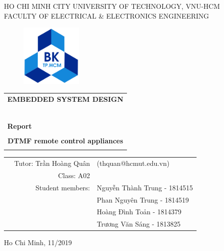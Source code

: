 \documentclass[a4paper]{article}
\begin{document}
\begin{titlepage}

\begin{center}
HO CHI MINH CITY UNIVERSITY OF TECHNOLOGY, VNU-HCM\\
FACULTY OF ELECTRICAL \& ELECTRONICS ENGINEERING
\end{center}

\vspace{1cm}

\begin{figure}[h!]
\begin{center}
\includegraphics[width=3cm]{hcmut.png}
\end{center}
\end{figure}

\vspace{1cm}


\begin{center}
\begin{tabular}{c}
\multicolumn{1}{l}{\textbf{{\Large EMBEDDED SYSTEM DESIGN}}}\\
~~\\
\hline
\\
\multicolumn{1}{l}{\textbf{{\Large Report}}}\\
\\
\textbf{\Huge DTMF remote control appliances}\\
\\
\hline
\end{tabular}
\end{center}

\vspace{3cm}

\begin{table}[h]
\begin{tabular}{rrl}

\hspace{5 cm} & Tutor: Trần Hoàng Quân & (thquan@hcmut.edu.vn)\\
& Class: A02\\
& Student members: & Nguyễn Thành Trung - 1814515 \\
& & Phan Nguyên Trung - 1814519 \\
& & Hoàng Đình Toản - 1814379 \\
& & Trương Văn Sáng - 1813825 \\

\end{tabular}
\end{table}

\begin{center}
{\footnotesize Ho Chi Minh, 11/2019}
\end{center}
\end{titlepage}
\end{document}

